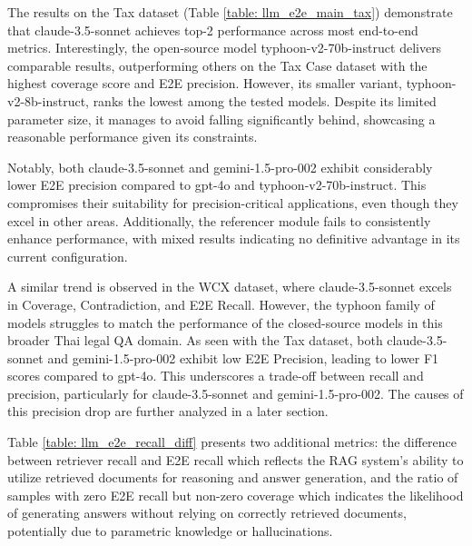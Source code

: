 

The results on the Tax dataset (Table \ref{table: llm_e2e_main_tax}) demonstrate that claude-3.5-sonnet achieves top-2 performance across most end-to-end metrics. Interestingly, the open-source model typhoon-v2-70b-instruct delivers comparable results, outperforming others on the Tax Case dataset with the highest coverage score and E2E precision. However, its smaller variant, typhoon-v2-8b-instruct, ranks the lowest among the tested models. Despite its limited parameter size, it manages to avoid falling significantly behind, showcasing a reasonable performance given its constraints.

Notably, both claude-3.5-sonnet and gemini-1.5-pro-002 exhibit considerably lower E2E precision compared to gpt-4o and typhoon-v2-70b-instruct. This compromises their suitability for precision-critical applications, even though they excel in other areas. Additionally, the referencer module fails to consistently enhance performance, with mixed results indicating no definitive advantage in its current configuration.

A similar trend is observed in the WCX dataset, where claude-3.5-sonnet excels in Coverage, Contradiction, and E2E Recall. However, the typhoon family of models struggles to match the performance of the closed-source models in this broader Thai legal QA domain. As seen with the Tax dataset, both claude-3.5-sonnet and gemini-1.5-pro-002 exhibit low E2E Precision, leading to lower F1 scores compared to gpt-4o. This underscores a trade-off between recall and precision, particularly for claude-3.5-sonnet and gemini-1.5-pro-002. The causes of this precision drop are further analyzed in a later section.

Table \ref{table: llm_e2e_recall_diff} presents two additional metrics: the difference between retriever recall and E2E recall which reflects the RAG system's ability to utilize retrieved documents for reasoning and answer generation, and the ratio of samples with zero E2E recall but non-zero coverage which indicates the likelihood of generating answers without relying on correctly retrieved documents, potentially due to parametric knowledge or hallucinations.


